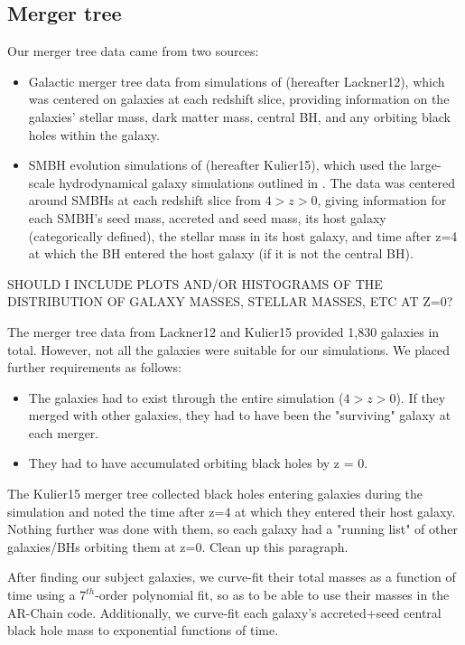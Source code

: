 \documentclass[english, apj]{emulateapj}
\begin{document}
\subsection{Merger tree}
Our merger tree data came from two sources:
\begin{itemize}
\item Galactic merger tree data from simulations of \citet{2012MNRAS.425..641L} (hereafter Lackner12), which was centered on galaxies at each redshift slice, providing information on the galaxies' stellar mass, dark matter mass, central BH, and any orbiting black holes within the galaxy.
\item SMBH evolution simulations of \citet{2015ApJ...799..178K} (hereafter Kulier15), which used the large-scale hydrodynamical galaxy simulations outlined in \citet{2011ApJ...741...99C, 2011ApJ...742L..33C, 2012ApJ...753...17C, 2012ApJ...748..121C, 2013ApJ...770..139C}.  The data was centered around SMBHs at each redshift slice from $4 > z > 0$, giving information for each SMBH's seed mass, accreted and seed mass, its host galaxy (categorically defined), the stellar mass in its host galaxy, and time after z=4 at which the BH entered the host galaxy (if it is not the central BH).
\end{itemize}

SHOULD I INCLUDE PLOTS AND/OR HISTOGRAMS OF THE DISTRIBUTION OF GALAXY MASSES, STELLAR MASSES, ETC AT Z=0?

The merger tree data from Lackner12 and Kulier15 provided 1,830 galaxies in total.  However, not all the galaxies were suitable for our simulations.  We placed further requirements as follows:
\begin{itemize}
\item The galaxies had to exist through the entire simulation ($4 > z > 0$).  If they merged with other galaxies, they had to have been the "surviving" galaxy at each merger.
\item They had to have accumulated orbiting black holes by z = 0.
\end{itemize}

The Kulier15 merger tree collected black holes entering galaxies during the simulation and noted the time after z=4 at which they entered their host galaxy.  Nothing further was done with them, so each galaxy had a "running list" of other galaxies/BHs orbiting them at z=0.  Clean up this paragraph.

After finding our subject galaxies, we curve-fit their total masses as a function of time using a $7^{th}$-order polynomial fit, so as to be able to use their masses in the AR-Chain code.  Additionally, we curve-fit each galaxy's accreted+seed central black hole mass to exponential functions of time.
\end{document}
